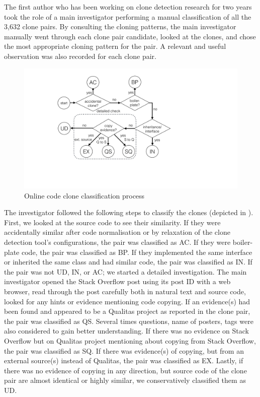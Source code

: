 \documentclass[sigconf,review, anonymous]{acmart}
\begin{document}
The first author who has been working on clone detection research for two years took the role of a main investigator performing a manual classification of all the 3,632 clone pairs. By consulting the cloning patterns, the main investigator manually went through each clone pair candidate, looked at the clones, and chose the most appropriate cloning pattern for the pair. A relevant and useful observation was also recorded for each clone pair. 

\begin{figure}
	\centering
	\includegraphics[width=0.6\linewidth]{classification_process}
	\caption{Online code clone classification process}
	\label{fig:classification_process}
\end{figure}

The investigator followed the following steps to classify the clones (depicted in ). First, we looked at the source code to see their similarity. If they were accidentally similar after code normalisation or by relaxation of the clone detection tool's configurations, the pair was classified as AC. If they were boiler-plate code, the pair was classified as BP. If they implemented the same interface or inherited the same class and had similar code, the pair was classified as IN. If the pair was not UD, IN, or AC; we started a detailed investigation. The main investigator opened the Stack Overflow post using its post ID with a web browser, read through the post carefully both in natural text and source code, looked for any hints or evidence mentioning code copying. If an evidence(s) had been found and appeared to be a Qualitas project as reported in the clone pair, the pair was classified as QS. Several times questions, name of posters, tags were also considered to gain better understanding. If there was no evidence on Stack Overflow but on Qualitas project mentioning about copying from Stack Overflow, the pair was classified as SQ. If there was evidence(s) of copying, but from an external source(s) instead of Qualitas, the pair was classified as EX. Lastly, if there was no evidence of copying in any direction, but source code of the clone pair are almost identical or highly similar, we conservatively classified them as UD.
  
\end{document}
